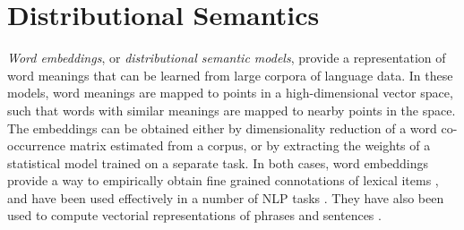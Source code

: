 \documentclass[9pt,twocolumn,twoside,lineno]{pnas-new}
\begin{document}
	\section{Distributional Semantics} \label{distmods}


	\emph{Word embeddings}, or \emph{distributional semantic models}, provide a representation of word meanings that can be learned from large corpora of language data. In these models, word meanings are mapped to points in a high-dimensional vector space, such that words with similar meanings are mapped to nearby points in the space. The embeddings can be obtained either by dimensionality reduction of a word co-occurrence matrix \cite{pennington2014glove} estimated from a corpus, or by extracting the weights of a statistical model \cite{mikolov2013distributed,peters2018deep,devlin2018bert} trained on a separate task. In both cases, word embeddings provide a way to empirically obtain fine grained connotations of lexical items \cite{mikolov2013distributed}, and have been used effectively in a number of NLP tasks \cite{dai2015semi,radford2018improving}. They have also been used to compute vectorial representations of phrases and sentences \cite{socher2013recursive, coecke2010mathematical}.


	
\end{document}
